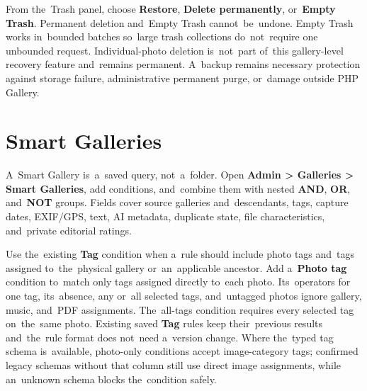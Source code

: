 \documentclass[11pt,a4paper]{article}
\newcommand{\ui}[1]{\textbf{#1}}
\begin{document}
From the~Trash panel, choose \ui{Restore}, \ui{Delete permanently}, or~\ui{Empty
Trash}. Permanent deletion and~Empty Trash cannot~be~undone. Empty Trash works
in~bounded batches so~large trash collections do~not~require one unbounded
request. Individual-photo deletion is~not~part of~this gallery-level recovery
feature and~remains permanent. A~backup remains necessary protection against
storage failure, administrative permanent purge, or~damage outside PHP Gallery.

\section{Smart Galleries}

A~Smart Gallery is~a~saved query, not~a~folder. Open \ui{Admin > Galleries >
Smart Galleries}, add conditions, and~combine them with nested \ui{AND},
\ui{OR}, and~\ui{NOT} groups. Fields cover source galleries and~descendants,
tags, capture dates, EXIF/GPS, text, AI metadata, duplicate state, file
characteristics, and~private editorial ratings.

Use the~existing \ui{Tag} condition when a~rule should include photo tags
and~tags
assigned to~the~physical gallery or~an~applicable ancestor. Add a~\ui{Photo tag}
condition to~match only tags assigned directly to~each photo. Its~operators for
one tag, its~absence, any or~all selected tags, and~untagged photos ignore
gallery, music, and~PDF assignments. The~all-tags condition requires every
selected tag on~the~same photo. Existing saved \ui{Tag} rules keep
their~previous
results and~the~rule format does not~need a~version change. Where the~typed tag
schema is~available, photo-only conditions accept image-category tags; confirmed
legacy schemas without that column still use direct image assignments, while
an~unknown schema blocks the~condition safely.
\end{document}
